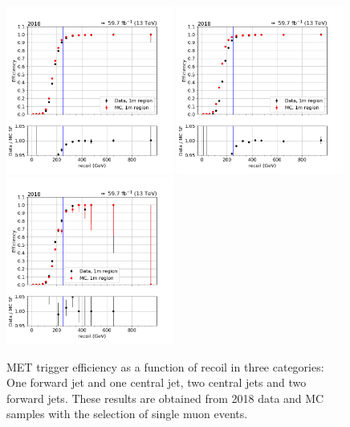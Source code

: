 \begin{figure}[hbp]
    \begin{center}
        \includegraphics[width=0.49\textwidth]{fig/efficiency/trigger/met/recoil/data_mc_comparison_1m_2018_one_jet_forward_one_jet_central.png}
        \includegraphics[width=0.49\textwidth]{fig/efficiency/trigger/met/recoil/data_mc_comparison_1m_2018_two_central_jets.png} \\
        \includegraphics[width=0.49\textwidth]{fig/efficiency/trigger/met/recoil/data_mc_comparison_1m_2018_two_forward_jets.png}
    \end{center}
    \caption{MET trigger efficiency as a function of recoil in three categories: One forward jet and one central jet, two central jets and
            two forward jets. These results are obtained from 2018 data and MC samples with the selection of single muon events.}
    \label{fig:eff_recoil_2018_1m}
\end{figure}

